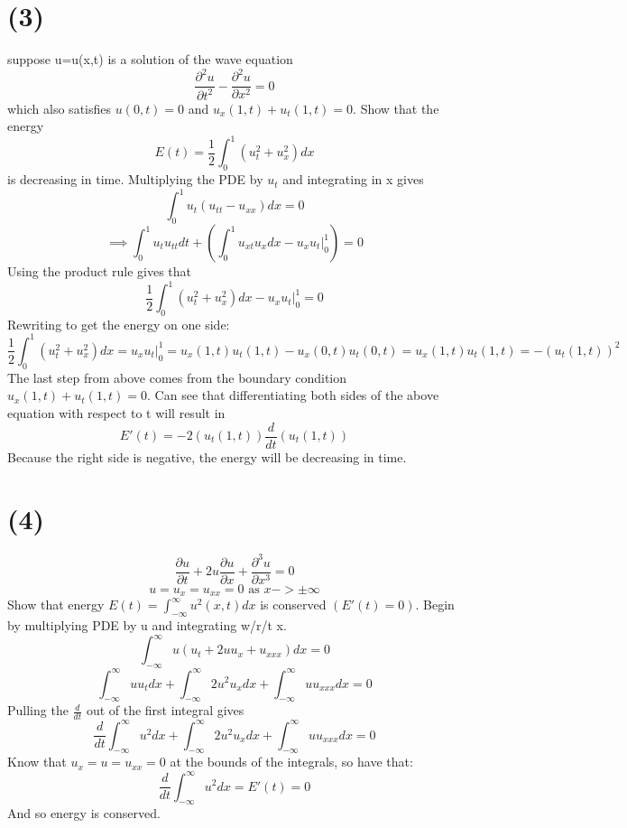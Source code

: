 \documentclass[preview,12pt]{article}
\begin{document}
\section*{(3)}
    suppose u=u(x,t) is a solution of the wave equation
    $$\frac{\partial^2u}{\partial t^2}-\frac{\partial^2u}{\partial x^2}=0$$
    which also satisfies $u(0,t)=0$ and $u_x(1,t)+u_t(1,t)=0$.  Show that the energy
    $$E(t)=\frac{1}{2}\int_0^1(u_t^2+u_x^2)dx$$
    is decreasing in time.
    Multiplying the PDE by $u_t$ and integrating in x gives
    $$\int_0^1 u_t(u_{tt}-u_{xx}) dx =0$$
    $$\implies \int_0^1u_tu_{tt}dt+(\int_0^1 u_{xt}u_x dx-u_xu_t|_0^1)=0$$
    Using the product rule gives that 
    $$\frac{1}{2}\int_0^1 (u_t^2+u_x^2) dx-u_xu_t|_0^1=0$$
    Rewriting to get the energy on one side:
    $$\frac{1}{2}\int_0^1 (u_t^2+u_x^2) dx=u_xu_t|_0^1=u_x(1,t)u_t(1,t)-u_x(0,t)u_t(0,t)=u_x(1,t)u_t(1,t)=-(u_t(1,t))^2$$
    The last step from above comes from the boundary condition $u_x(1,t)+u_t(1,t)=0$. \newline
    Can see that differentiating both sides of the above equation with respect to t will result in 
    $$E'(t)=-2(u_t(1,t))\frac{d}{dt}(u_t(1,t))$$
    Because the right side is negative, the energy will be decreasing in time.
    
\section*{(4)}
    $$ \frac{\partial u}{\partial t}+2u\frac{\partial u}{\partial x}+\frac{\partial^3u}{\partial x^3}=0$$
    $$u=u_x=u_{xx}=0 \textrm{ as } x->\pm\infty$$
    Show that energy $E(t)=\int_{-\infty}^\infty u^2(x,t)dx$ is conserved $(E'(t)=0)$. \newline
    Begin by multiplying PDE by u and integrating w/r/t x.
    $$ \int_{-\infty}^\infty u(u_t+2uu_x+u_{xxx})dx=0$$
    $$ \int_{-\infty}^\infty uu_t dx+ \int_{-\infty}^\infty 2u^2u_x dx + \int_{-\infty}^\infty uu_{xxx}dx=0$$
    Pulling the $\frac{d}{dt}$ out of the first integral gives
    $$\frac{d}{dt}\int_{-\infty}^\infty u^2 dx+ \int_{-\infty}^\infty 2u^2u_x dx + \int_{-\infty}^\infty uu_{xxx}dx=0$$
    Know that $u_x=u=u_{xx}=0$ at the bounds of the integrals, so have that:
    $$\frac{d}{dt}\int_{-\infty}^\infty u^2 dx=E'(t)=0$$ 
    And so energy is conserved. 
\end{document}
